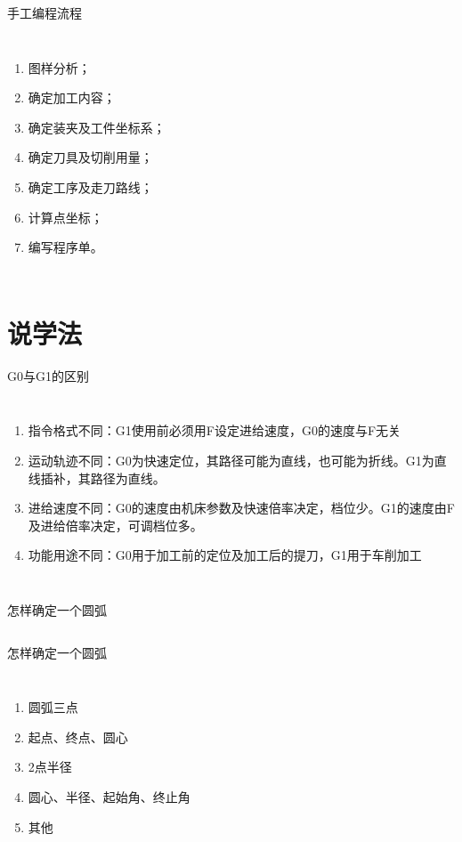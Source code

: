 \documentclass[UTF8,zihao=-4]{ctexbeamer}
\begin{document}
\begin{frame}{手工编程流程}
    \begin{columns}[onlytextwidth]
\begin{enumerate}
    \item 图样分析；
    \item 确定加工内容；
    \item 确定装夹及工件坐标系；
    \item 确定刀具及切削用量；
    \item 确定工序及走刀路线；
    \item 计算点坐标；
    \item 编写程序单。
\end{enumerate}
    \end{columns}
\end{frame}


\section{说学法}
\begin{frame}{G0与G1的区别}
    \begin{columns}[onlytextwidth]
        \column{\textwidth}
\begin{enumerate}
    \item 指令格式不同：G1使用前必须用F设定进给速度，G0的速度与F无关 
    \item 运动轨迹不同：G0为快速定位，其路径可能为直线，也可能为折线。G1为直线插补，其路径为直线。
    \item 进给速度不同：G0的速度由机床参数及快速倍率决定，档位少。G1的速度由F及进给倍率决定，可调档位多。
    \item 功能用途不同：G0用于加工前的定位及加工后的提刀，G1用于车削加工
\end{enumerate}
    \end{columns}
\end{frame}


\begin{frame}{怎样确定一个圆弧}
    \begin{columns}
        \column{\textwidth}
    \end{columns}
\end{frame}

\begin{frame}{怎样确定一个圆弧}
    \begin{columns}
        \column{\textwidth}
        \begin{enumerate}
            \item 圆弧三点
            \item 起点、终点、圆心
            \item 2点半径
            \item 圆心、半径、起始角、终止角
            \item 其他
        \end{enumerate}
    \end{columns}
\end{frame}
\end{document}
